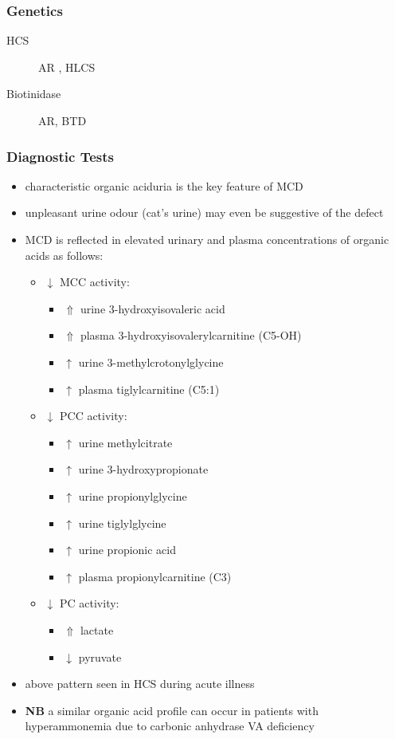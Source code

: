 \documentclass{scrartcl}
\begin{document}
\subsubsection{Genetics}
\label{sec:orgf68e710}
\begin{description}
\item[{HCS}] AR , HLCS
\item[{Biotinidase}] AR, BTD
\end{description}

\subsubsection{Diagnostic Tests}
\label{sec:orgdcdba27}
\begin{itemize}
\item characteristic organic aciduria is the key feature of MCD
\item unpleasant urine odour (cat’s urine) may even be suggestive of the
defect
\item MCD is reflected in elevated urinary and plasma concentrations of
organic acids as follows:
\begin{itemize}
\item \(\downarrow\) MCC activity:
\begin{itemize}
\item \(\Uparrow\) urine 3-hydroxyisovaleric acid
\item \(\Uparrow\) plasma 3-hydroxyisovalerylcarnitine (C5-OH)
\item \(\uparrow\) urine 3-methylcrotonylglycine
\item \(\uparrow\) plasma tiglylcarnitine (C5:1)
\end{itemize}
\item \(\downarrow\) PCC activity:
\begin{itemize}
\item \(\uparrow\) urine methylcitrate
\item \(\uparrow\) urine 3-hydroxypropionate
\item \(\uparrow\) urine propionylglycine
\item \(\uparrow\) urine tiglylglycine
\item \(\uparrow\) urine propionic acid
\item \(\uparrow\) plasma propionylcarnitine (C3)
\end{itemize}
\item \(\downarrow\) PC activity:
\begin{itemize}
\item \(\Uparrow\) lactate
\item \(\downarrow\) pyruvate
\end{itemize}
\end{itemize}
\item above pattern seen in HCS during acute illness
\item \textbf{NB} a similar organic acid profile can occur in patients with
hyperammonemia due to carbonic anhydrase VA deficiency
\end{itemize}
\end{document}
